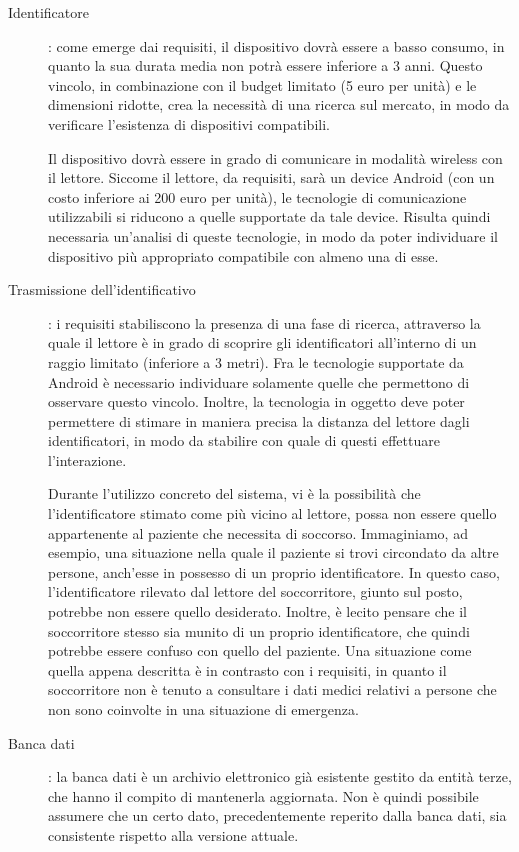 \documentclass[a4paper,12pt]{report}
\begin{document}
\begin{description}
	\item[Identificatore]: come emerge dai requisiti, il dispositivo dovrà essere a basso consumo, in quanto la sua durata media non potrà essere inferiore a 3 anni. Questo vincolo, in combinazione con il budget limitato (5 euro per unità) e le dimensioni ridotte, crea la necessità di una ricerca sul mercato, in modo da verificare l'esistenza di dispositivi compatibili.
	
	Il dispositivo dovrà essere in grado di comunicare in modalità wireless con il lettore. Siccome il lettore, da requisiti, sarà un device Android (con un costo inferiore ai 200 euro per unità), le tecnologie di comunicazione utilizzabili si riducono a quelle supportate da tale device. Risulta quindi necessaria un'analisi di queste tecnologie, in modo da poter individuare il dispositivo più appropriato compatibile con almeno una di esse. 
	
	\item[Trasmissione dell'identificativo]: i requisiti stabiliscono la presenza di una fase di ricerca, attraverso la quale il lettore è in grado di scoprire gli identificatori all'interno di un raggio limitato (inferiore a 3 metri). Fra le tecnologie supportate da Android è necessario individuare solamente quelle che permettono di osservare questo vincolo. Inoltre, la tecnologia in oggetto deve poter permettere di stimare in maniera precisa la distanza del lettore dagli identificatori, in modo da stabilire con quale di questi effettuare l'interazione.
	
	Durante l'utilizzo concreto del sistema, vi è la possibilità che l'identificatore stimato come più vicino al lettore, possa non essere quello appartenente al paziente che necessita di soccorso. Immaginiamo, ad esempio, una situazione nella quale il paziente si trovi circondato da altre persone, anch'esse in possesso di un proprio identificatore. In questo caso, l'identificatore rilevato dal lettore del soccorritore, giunto sul posto, potrebbe non essere quello desiderato. Inoltre, è lecito pensare che il soccorritore stesso sia munito di un proprio identificatore, che quindi potrebbe essere confuso con quello del paziente. Una situazione come quella appena descritta è in contrasto con i requisiti, in quanto il soccorritore non è tenuto a consultare i dati medici relativi a persone che non sono coinvolte in una situazione di emergenza. 
	
	\item[Banca dati]: la banca dati è un archivio elettronico già esistente gestito da entità terze, che hanno il compito di mantenerla aggiornata. Non è quindi possibile assumere che un certo dato, precedentemente reperito dalla banca dati, sia consistente rispetto alla versione attuale. 
	

\end{description}
\end{document}

